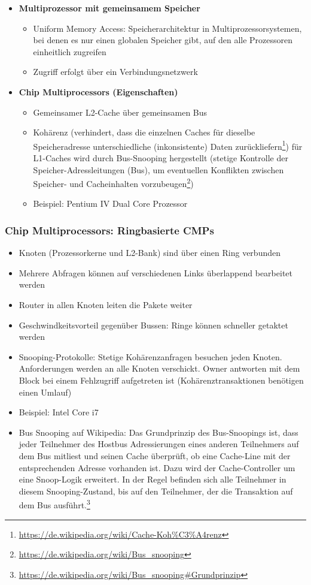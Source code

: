 \begin{itemize}
\begin{itemize}
	\end{itemize}
	\item \textbf{Multiprozessor mit gemeinsamem Speicher}
	\begin{itemize}
		\item Uniform Memory Access: Speicherarchitektur in Multiprozessorsystemen, bei denen es nur einen globalen Speicher gibt, auf den alle Prozessoren einheitlich zugreifen
		\item Zugriff erfolgt über ein Verbindungsnetzwerk
	\end{itemize}
	\item \textbf{Chip Multiprocessors (Eigenschaften)}
	\begin{itemize}
		\item Gemeinsamer L2-Cache über gemeinsamen Bus
		\item Kohärenz (verhindert, dass die einzelnen Caches für dieselbe Speicheradresse unterschiedliche (inkonsistente) Daten zurückliefern\footnote{\url{https://de.wikipedia.org/wiki/Cache-Koh\%C3\%A4renz}}) für L1-Caches wird durch Bus-Snooping hergestellt (stetige Kontrolle der Speicher-Adressleitungen (Bus), um eventuellen Konflikten zwischen Speicher- und Cacheinhalten vorzubeugen\footnote{\url{https://de.wikipedia.org/wiki/Bus_snooping}})
		\item Beispiel: Pentium IV Dual Core Prozessor
	\end{itemize}
\end{itemize}

\subsubsection{Chip Multiprocessors: Ringbasierte CMPs}
\begin{itemize}
	\item Knoten (Prozessorkerne und L2-Bank) sind über einen Ring verbunden
	\item Mehrere Abfragen können auf verschiedenen Links überlappend bearbeitet werden
	\item Router in allen Knoten leiten die Pakete weiter
	\item Geschwindkeitsvorteil gegenüber Bussen: Ringe können schneller getaktet werden
	\item Snooping-Protokolle: Stetige Kohärenzanfragen besuchen jeden Knoten. Anforderungen werden an alle Knoten verschickt. Owner antworten mit dem Block bei einem Fehlzugriff aufgetreten ist (Kohärenztransaktionen benötigen einen Umlauf)
	\item Beispiel: Intel Core i7
	\item Bus Snooping auf Wikipedia: Das Grundprinzip des Bus-Snoopings ist, dass jeder Teilnehmer des Hostbus Adressierungen eines anderen Teilnehmers auf dem Bus mitliest und seinen Cache überprüft, ob eine Cache-Line mit der entsprechenden Adresse vorhanden ist. Dazu wird der Cache-Controller um eine Snoop-Logik erweitert. In der Regel befinden sich alle Teilnehmer in diesem Snooping-Zustand, bis auf den Teilnehmer, der die Transaktion auf dem Bus ausführt.\footnote{\url{https://de.wikipedia.org/wiki/Bus_snooping\#Grundprinzip}}
\end{itemize}


